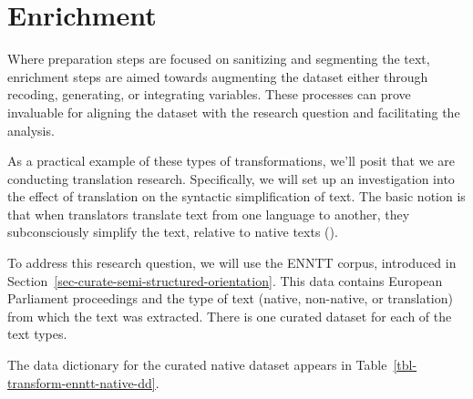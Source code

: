 \documentclass[
  letterpaper,
  krantz1]{latex/krantz-mod}
\theoremstyle{definition}
\theoremstyle{definition}
\theoremstyle{remark}
\begin{document}
\section{Enrichment}\label{sec-transform-enrichment}

Where preparation steps are focused on sanitizing and segmenting the
text, enrichment steps are aimed towards augmenting the dataset either
through recoding, generating, or integrating
variables. These processes can prove
invaluable for aligning the dataset with the research question and
facilitating the analysis.

As a practical example of these types of transformations, we'll posit
that we are conducting translation research. Specifically, we will set
up an investigation into the effect of translation on the syntactic
simplification of text. The basic notion is that when translators
translate text from one language to another, they subconsciously
simplify the text, relative to native texts ().

To address this research question, we will use the ENNTT
corpus,
introduced in Section~\ref{sec-curate-semi-structured-orientation}. This
data contains European Parliament proceedings and the type of text
(native, non-native, or translation) from which the text was extracted.
There is one curated dataset for each of the text types.

The data dictionary for the curated native dataset appears in
Table~\ref{tbl-transform-enntt-native-dd}.
\end{document}
